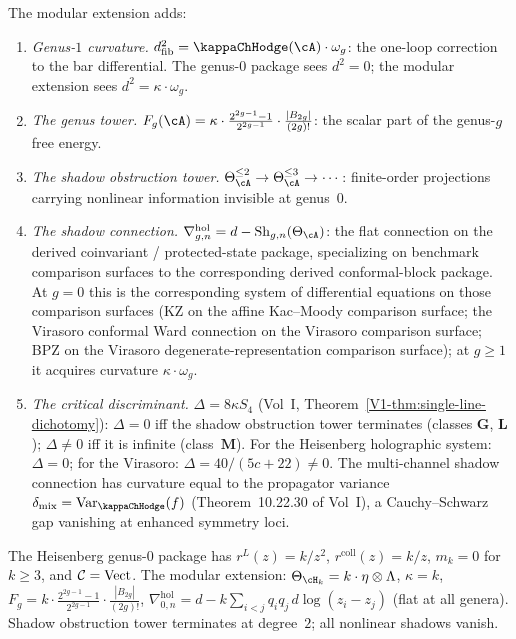 \begin{construction}
The modular extension adds:
\begin{enumerate}[label=\textup{(\roman*)}]
\item \emph{Genus-$1$ curvature.}
 $d_{\mathrm{fib}}^2=\kappaChHodge(\cA)\cdot\omega_g$: the
 one-loop correction to the bar differential. The genus-$0$
 package sees $d^2=0$; the modular extension sees
 $d^2=\kappa\cdot\omega_g$.
\item \emph{The genus tower.}
 $F_g(\cA)=\kappa\cdot \tfrac{2^{2g-1}-1}{2^{2g-1}}\cdot\tfrac{|B_{2g}|}{(2g)!}$: the scalar
 part of the genus-$g$ free energy.
\item \emph{The shadow obstruction tower.}
 $\Theta_\cA^{\le 2}\to\Theta_\cA^{\le 3}\to\cdots$:
 finite-order projections carrying nonlinear
 information invisible at genus~$0$.
\item \emph{The shadow connection.}
 $\nabla^{\mathrm{hol}}_{g,n}=d-\mathrm{Sh}_{g,n}(\Theta_\cA)$:
 the flat connection on the derived coinvariant /
 protected-state package, specializing on benchmark
 comparison surfaces to the corresponding derived
 conformal-block package. At
 $g=0$ this is the corresponding system of differential equations
 on those comparison surfaces (KZ on the affine Kac--Moody
 comparison surface; the Virasoro conformal Ward connection on the
 Virasoro comparison surface; BPZ on the Virasoro
 degenerate-representation comparison surface);
 at $g\ge 1$ it acquires curvature $\kappa\cdot\omega_g$.
\item \emph{The critical discriminant.}
 $\Delta=8\kappa S_4$
 (Vol~I, Theorem~\ref*{V1-thm:single-line-dichotomy}):
 $\Delta = 0$ iff the shadow obstruction tower terminates (classes
 $\mathbf{G}$, $\mathbf{L}$); $\Delta\neq 0$ iff it
 is infinite (class~$\mathbf{M}$).
 For the Heisenberg holographic system:
 $\Delta=0$; for the Virasoro:
 $\Delta=40/(5c{+}22)\neq 0$.
 The multi-channel shadow connection has curvature equal to the propagator variance $\delta_{\mathrm{mix}} = \operatorname{Var}_\kappaChHodge(f)$ (Theorem~10.22.30 of Vol~I), a Cauchy--Schwarz gap vanishing at enhanced symmetry loci.
\end{enumerate}
\end{construction}

\begin{computation}
The Heisenberg genus-$0$ package has
$r^L(z)=k/z^2$, $r^{\mathrm{coll}}(z)=k/z$, $m_k=0$ for $k\ge 3$,
and $\mathcal C=\mathrm{Vect}$.
The modular extension:
$\Theta_{\cH_k}=k\cdot\eta\otimes\Lambda$,
$\kappa=k$,
$F_g=k\cdot \tfrac{2^{2g-1}-1}{2^{2g-1}}\cdot\tfrac{|B_{2g}|}{(2g)!}$,
$\nabla^{\mathrm{hol}}_{0,n}
=d-k\sum_{i<j}q_iq_j\,d\log(z_i-z_j)$
(flat at all genera).
Shadow obstruction tower terminates at degree~$2$; all nonlinear
shadows vanish.
\end{computation}

